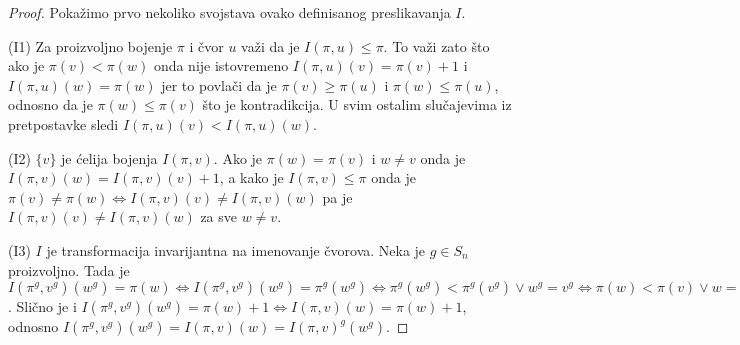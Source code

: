 \documentclass[12pt,oneside]{memoir}
\theoremstyle{definition}
\begin{document}
  \begin{proof} Pokažimo prvo nekoliko svojstava ovako definisanog
	  preslikavanja $I$.

	  (I1) Za proizvoljno bojenje $\pi$ i čvor $u$ važi da je $I(\pi, u) \leq \pi$.
	  To važi zato što ako je $\pi(v) < \pi(w)$ onda nije istovremeno $I(\pi,
	  u)(v) = \pi(v) + 1$ i $I(\pi, u)(w) = \pi(w)$ jer to povlači da je
	  $\pi(v) \geq \pi(u)$ i $\pi(w) \leq \pi(u)$, odnosno da je $\pi(w) \leq
	  \pi(v)$ što je kontradikcija. U svim ostalim slučajevima iz pretpostavke
	  sledi $I(\pi, u)(v) < I(\pi, u)(w)$.

	  (I2) $\{v\}$ je ćelija bojenja $I(\pi, v)$. Ako je $\pi(w) = \pi(v)$ i $w \neq
	  v$ onda je $I(\pi, v)(w) = I(\pi, v)(v) + 1$, a kako je $I(\pi, v) \leq
	  \pi$ onda je $\pi(v) \neq \pi(w) \iff I(\pi, v)(v) \neq I(\pi, v)(w)$ pa
	  je $I(\pi, v)(v) \neq I(\pi, v)(w)$ za sve $w \neq v$.

	  (I3) $I$ je transformacija invarijantna na imenovanje čvorova. Neka je $g \in
	  S_n$ proizvoljno. Tada je $I(\pi^g, v^g)(w^g) = \pi(w) \iff I(\pi^g,
	  v^g)(w^g) = \pi^g(w^g) \iff \pi^g(w^g) < \pi^g(v^g) \lor w^g = v^g \iff
	  \pi(w) < \pi(v) \lor w = v \iff I(\pi, v)(w) = \pi(w)$. Slično je i
	  $I(\pi^g, v^g)(w^g) = \pi(w) + 1 \iff I(\pi, v)(w) = \pi(w) + 1$, odnosno
	  $I(\pi^g, v^g)(w^g) = I(\pi, v)(w) = I(\pi, v)^g(w^g)$.


\end{proof}
\end{document}
